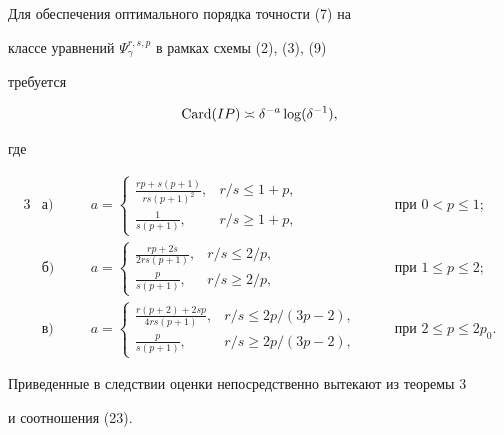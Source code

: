 \begin{cor} Для обеспечения оптимального порядка точности (7) на


классе уравнений $\Psi^{r,s,p}_\gamma$ в рамках схемы (2), (3), (9)


требуется


$$


\Card(IP) \asymp \delta^{-a} \log(\delta^{-1}),


$$


где


\begin{alignat*}{3}


&\text{а)} &\quad &a =


\begin{cases}


\frac{rp+s(p+1)}{rs(p+1)^2} , & r/s\le 1+p, \\


\frac{1}{s(p+1)} , & r/s\ge 1+p,


\end{cases} &\quad &\text{при } 0<p\le 1; \\


&\text{б)} &\quad &a =


\begin{cases}


\frac{rp+2s}{2rs(p+1)}, & r/s\le 2/p, \\


\frac{p}{s(p+1)} , & r/s\ge 2/p,


\end{cases} &\quad &\text{при }1\le p\le 2 ; \\


&\text{в)} &\quad &a =


\begin{cases}


\frac{r(p+2)+2sp}{4rs(p+1)} , & r/s\le 2p/(3p-2),\\


\frac{p}{s(p+1)} , & r/s\ge 2p/(3p-2),


\end{cases} &\quad  &\text{при } 2\le p\le 2p_0.


\end{alignat*}


\end{cor}





Приведенные в следствии оценки непосредственно вытекают из теоремы 3


и соотношения (23).






